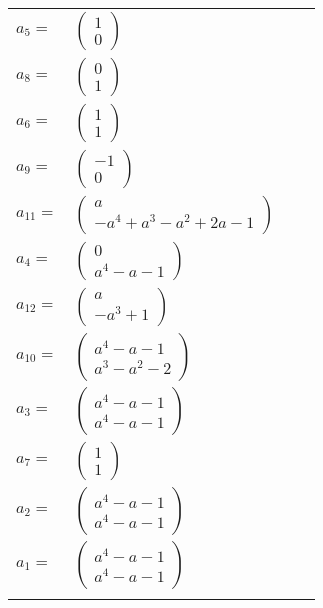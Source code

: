 \documentclass[1p]{elsarticle_modified}
\theoremstyle{definition}
\begin{document}
\begin{tabular}{m{7pt} m{180pt} m{7pt} m{180pt} }
\flushright $a_{5}=$&$\begin{pmatrix}1\\0\end{pmatrix}$ \\
\flushright $a_{8}=$&$\begin{pmatrix}0\\1\end{pmatrix}$ \\
\flushright $a_{6}=$&$\begin{pmatrix}1\\1\end{pmatrix}$ \\
\flushright $a_{9}=$&$\begin{pmatrix}-1\\0\end{pmatrix}$ \\
\flushright $a_{11}=$&$\begin{pmatrix}a\\- a^4+a^3- a^2+2 a-1\end{pmatrix}$ \\
\flushright $a_{4}=$&$\begin{pmatrix}0\\a^4- a-1\end{pmatrix}$ \\
\flushright $a_{12}=$&$\begin{pmatrix}a\\- a^3+1\end{pmatrix}$ \\
\flushright $a_{10}=$&$\begin{pmatrix}a^4- a-1\\a^3- a^2-2\end{pmatrix}$ \\
\flushright $a_{3}=$&$\begin{pmatrix}a^4- a-1\\a^4- a-1\end{pmatrix}$ \\
\flushright $a_{7}=$&$\begin{pmatrix}1\\1\end{pmatrix}$ \\
\flushright $a_{2}=$&$\begin{pmatrix}a^4- a-1\\a^4- a-1\end{pmatrix}$ \\
\flushright $a_{1}=$&$\begin{pmatrix}a^4- a-1\\a^4- a-1\end{pmatrix}$\\&\end{tabular}
\end{document}

